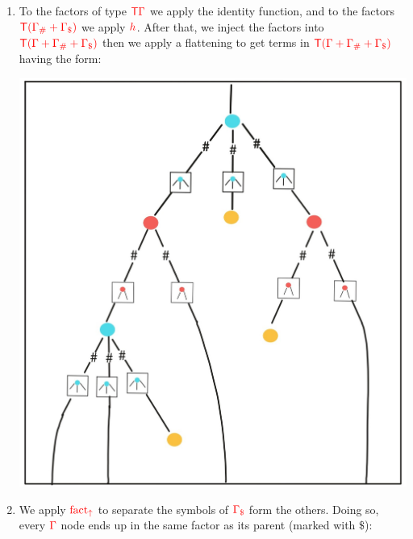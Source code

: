 \begin{example}
\begin{enumerate}
\item To the factors of type ${\color{red}{\mathsf T}} {\color{red}{\Gamma}}$ we apply the identity function, and to the factors ${\color{red}{{\color{red}{\mathsf T}}({\color{red}{\Gamma}}_\#+{\color{red}{\Gamma}}_\$)}}$ we apply ${\color{red}{h}}$. After that, we inject the factors into ${\color{red}{{\color{red}{\mathsf T}}({\color{red}{\Gamma}}+{\color{red}{\Gamma}}_\#+{\color{red}{\Gamma}}_\$)}}$ then we apply a flattening to get terms in ${\color{red}{{\color{red}{\mathsf T}}({\color{red}{\Gamma}}+{\color{red}{\Gamma}}_\#+{\color{red}{\Gamma}}_\$)}}$ having the form:
\begin{center}
\includegraphics[scale=.15]{MyPic4.jpg}
\end{center} 
\item We apply ${\color{red}{\mathrm{fact_{\uparrow}}}}$ to separate the symbols of ${\color{red}{{\color{red}{\Gamma}}_\$}}$ form the others. Doing so, every ${\color{red}{\Gamma}}$ node ends up in the same factor as its parent (marked with $\$ $):
\begin{center}

\end{center}
\end{enumerate}
\end{example}
